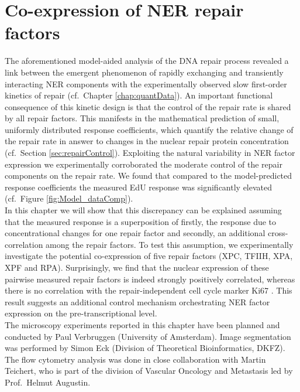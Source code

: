 \chapter{Co-expression of NER repair factors}
\label{chap:crossCorell}
The aforementioned model-aided analysis of the DNA repair process revealed a link between the emergent phenomenon of rapidly exchanging and transiently interacting NER components with the experimentally observed slow first-order kinetics of repair (cf.\ Chapter \ref{chap:quantData}). An important functional consequence of this kinetic design is that the control of the repair rate is shared by all repair factors. This manifests in the mathematical prediction of small, uniformly distributed response coefficients, which quantify the relative change of the repair rate in answer to changes in the nuclear repair protein concentration (cf.\ Section \ref{sec:repairControl}). Exploiting the natural variability in NER factor expression we experimentally corroborated the moderate control of the repair components on the repair rate. We found that compared to the model-predicted response coefficients the measured EdU response was significantly elevated (cf.\ Figure \ref{fig:Model_dataComp}). \\ 
In this chapter we will show that this discrepancy can be explained assuming that the measured response is a superposition of firstly, the response due to concentrational changes for one repair factor and secondly, an additional cross-correlation among the repair factors. To test this assumption, we experimentally investigate the potential co-expression of five repair factors (XPC, TFIIH, XPA, XPF and RPA). Surprisingly, we find that the nuclear expression of these pairwise measured repair factors is indeed strongly positively correlated, whereas there is no correlation with the repair-independent cell cycle marker Ki67 \cite{Scholzen2000}. This result suggests an additional control mechanism orchestrating NER factor expression on the pre-transcriptional level.\\ 

The microscopy experiments reported in this chapter have been planned and conducted by Paul Verbruggen (University of Amsterdam). Image segmentation was performed by Simon Eck (Division of Theoretical Bioinformatics, DKFZ). The flow cytometry analysis was done in close collaboration with Martin Teichert, who is part of the division of Vascular Oncology and Metastasis led by Prof.\ Helmut Augustin. 
 



